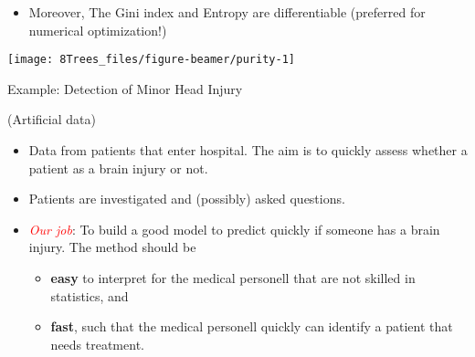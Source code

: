 \documentclass[10pt,ignorenonframetext,]{beamer}
\providecommand{\tightlist}{%
  \setlength{\itemsep}{0pt}\setlength{\parskip}{0pt}}
\begin{document}
\begin{frame}

\begin{itemize}
\tightlist
\item
  Moreover, The Gini index and Entropy are differentiable (preferred for
  numerical optimization!)
\end{itemize}

\begin{center}\texttt{[image: 8Trees\_files/figure-beamer/purity-1]} \end{center}

\end{frame}

\begin{frame}

\begin{block}{Example: Detection of Minor Head Injury}

\tiny

(Artificial data) \vspace{2mm}

\normalsize

\begin{itemize}
\tightlist
\item
  Data from patients that enter hospital. The aim is to quickly assess
  whether a patient as a brain injury or not.
\end{itemize}

\vspace{2mm}

\begin{itemize}
\tightlist
\item
  Patients are investigated and (possibly) asked questions.
\end{itemize}

\vspace{2mm}

\begin{itemize}
\item
  \emph{\textcolor{red}{Our job}}: To build a good model to predict
  quickly if someone has a brain injury. The method should be
  \vspace{1mm}

  \begin{itemize}
  \item
    \textbf{easy} to interpret for the medical personell that are not
    skilled in statistics, and \vspace{1mm}
  \item
    \textbf{fast}, such that the medical personell quickly can identify
    a patient that needs treatment.
  \end{itemize}
\end{itemize}

\end{block}

\end{frame}
\end{document}
